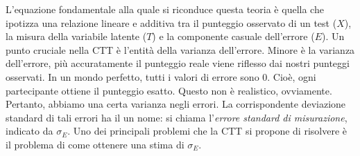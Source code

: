 
L'equazione fondamentale alla quale si riconduce questa teoria è quella che ipotizza una relazione lineare e additiva tra il punteggio osservato di un test ($X$), la misura della variabile latente ($T$) e la componente casuale dell'errore ($E$). 
Un punto cruciale nella CTT è l'entità della varianza dell'errore. 
Minore è la varianza dell'errore, più accuratamente il punteggio reale viene riflesso dai nostri punteggi osservati. 
In un mondo perfetto, tutti i valori di errore sono 0. 
Cioè, ogni partecipante ottiene il punteggio esatto. 
Questo non è realistico, ovviamente. Pertanto, abbiamo una certa varianza negli errori.
La corrispondente deviazione standard di tali errori ha il un nome: si chiama l'\emph{errore standard di misurazione}, indicato da $\sigma_E$. 
Uno dei principali problemi che la CTT si propone di risolvere è il problema di come ottenere una stima di $\sigma_E$.

